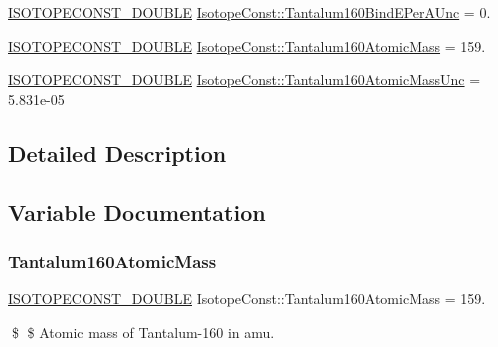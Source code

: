 \begin{DoxyCompactItemize}
\mbox{\hyperlink{group___isotope_const-_macros_ga8f45a7272ce02c0b4c65c44636ed719a}{I\+S\+O\+T\+O\+P\+E\+C\+O\+N\+S\+T\+\_\+\+D\+O\+U\+B\+LE}} \mbox{\hyperlink{group___isotope_const-_tantalum-_ta160_ga8f57d0c4702bf715be0608361db0e739}{Isotope\+Const\+::\+Tantalum160\+Bind\+E\+Per\+A\+Unc}} = 0.
\item 
\mbox{\hyperlink{group___isotope_const-_macros_ga8f45a7272ce02c0b4c65c44636ed719a}{I\+S\+O\+T\+O\+P\+E\+C\+O\+N\+S\+T\+\_\+\+D\+O\+U\+B\+LE}} \mbox{\hyperlink{group___isotope_const-_tantalum-_ta160_ga66bf60f16dca64d98945830b3a929b60}{Isotope\+Const\+::\+Tantalum160\+Atomic\+Mass}} = 159.
\item 
\mbox{\hyperlink{group___isotope_const-_macros_ga8f45a7272ce02c0b4c65c44636ed719a}{I\+S\+O\+T\+O\+P\+E\+C\+O\+N\+S\+T\+\_\+\+D\+O\+U\+B\+LE}} \mbox{\hyperlink{group___isotope_const-_tantalum-_ta160_ga05fd9ac68c4cf4ac33f5c66541d6063f}{Isotope\+Const\+::\+Tantalum160\+Atomic\+Mass\+Unc}} = 5.\+831e-\/05
\end{DoxyCompactItemize}


\subsection{Detailed Description}


\subsection{Variable Documentation}
\mbox{\label{group___isotope_const-_tantalum-_ta160_ga66bf60f16dca64d98945830b3a929b60}} 
\subsubsection{\texorpdfstring{Tantalum160\+Atomic\+Mass}{Tantalum160AtomicMass}}
{\footnotesize\ttfamily \mbox{\hyperlink{group___isotope_const-_macros_ga8f45a7272ce02c0b4c65c44636ed719a}{I\+S\+O\+T\+O\+P\+E\+C\+O\+N\+S\+T\+\_\+\+D\+O\+U\+B\+LE}} Isotope\+Const\+::\+Tantalum160\+Atomic\+Mass = 159.}

\$ \$ Atomic mass of Tantalum-\/160 in amu. \mbox{\label{group___isotope_const-_tantalum-_ta160_ga05fd9ac68c4cf4ac33f5c66541d6063f}} 
